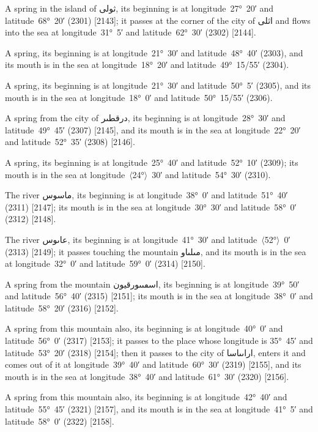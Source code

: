 \documentclass[11pt]{article}
\newcommand{\Pg}[1]{\marginpar{\footnotesize #1}}
\newcommand{\Ang}[1]{\ensuremath{#1}}
\begin{document}
A spring in the island of \textarabic{ثولى}, its beginning is at longitude~27°~20′ and latitude~68°~20′ (2301) [2143]; it passes at the corner of the city of \textarabic{اثلى} and flows into the sea at longitude~31°~5′ and latitude~62°~30′ (2302) [2144].

\Pg{p. 152}A spring, its beginning is at longitude~21°~30′ and latitude~48°~40′ (2303), and its mouth is in the sea at longitude~18°~20′ and latitude~49°~15/55′ (2304).

A spring, its beginning is at longitude~21°~30′ and latitude~50°~5′ (2305), and its mouth is in the sea at longitude~18°~0′ and latitude~50°~15/55′ (2306).

A spring from the city of \textarabic{درقطٮر}, its beginning is at longitude~28°~30′ and latitude~49°~45′ (2307) [2145], and its mouth is in the sea at longitude~22°~20′ and latitude~52°~35′ (2308) [2146].

A spring, its beginning is at longitude~25°~40′ and latitude~52°~10′ (2309); its mouth is in the sea at longitude~\Ang{\langle}24°\Ang{\rangle}~30′ and latitude~54°~30′ (2310).

The river \textarabic{ماسوس}, its beginning is at longitude~38°~0′ and latitude~51°~40′ (2311) [2147]; its mouth is in the sea at longitude~30°~30′ and latitude~58°~0′ (2312) [2148].

The river \textarabic{عاٮوس}, its beginning is at longitude~41°~30′ and latitude~\Ang{\langle}52°\Ang{\rangle}~0′ (2313) [2149]; it passes touching the mountain \textarabic{مٮلٮاو}, and its mouth is in the sea at longitude~32°~0′ and latitude~59°~0′ (2314) [2150].

A spring from the mountain \textarabic{اسڡٮٮورقيون}, its beginning is at longitude~39°~50′ and latitude~56°~40′ (2315) [2151]; its mouth is in the sea at longitude~38°~0′ and latitude~58°~20′ (2316) [2152].

A spring from this mountain also, its beginning is at longitude~40°~0′ and latitude~56°~0′ (2317) [2153]; it passes to the place whose longitude is 35°~45′ and latitude~53°~20′ (2318) [2154]; then it passes to the city of \textarabic{اراٮٮاسا}, enters it and comes out of it at longitude~39°~40′ and latitude~60°~30′ (2319) [2155], and its mouth is in the sea at longitude~38°~40′ and latitude~61°~30′ (2320) [2156].

A spring from this mountain also, its beginning is at longitude~42°~40′ and latitude~55°~45′ (2321) [2157], and its mouth is in the sea at longitude~41°~5′ and latitude~58°~0′ (2322) [2158]\Pg{p. 153}.
\end{document}
